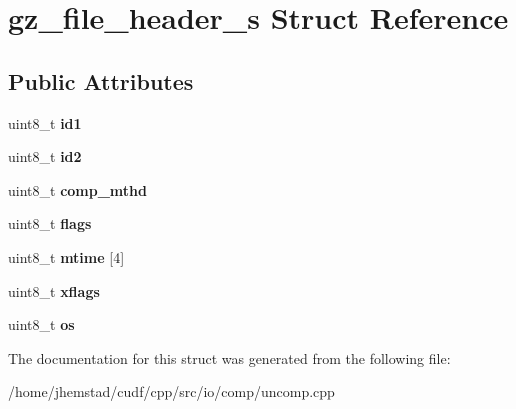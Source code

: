 \hypertarget{structgz__file__header__s}{}\section{gz\+\_\+file\+\_\+header\+\_\+s Struct Reference}
\label{structgz__file__header__s}
\subsection*{Public Attributes}
\begin{DoxyCompactItemize}
\item 
uint8\+\_\+t {\bfseries id1}\hypertarget{structgz__file__header__s_abebc6d25117c54f8409f36bf487ece32}{}\label{structgz__file__header__s_abebc6d25117c54f8409f36bf487ece32}

\item 
uint8\+\_\+t {\bfseries id2}\hypertarget{structgz__file__header__s_acc9fbe962b914c084b169bff7b0e0273}{}\label{structgz__file__header__s_acc9fbe962b914c084b169bff7b0e0273}

\item 
uint8\+\_\+t {\bfseries comp\+\_\+mthd}\hypertarget{structgz__file__header__s_a70b3ece52f22ecba25cc04e128dfa5de}{}\label{structgz__file__header__s_a70b3ece52f22ecba25cc04e128dfa5de}

\item 
uint8\+\_\+t {\bfseries flags}\hypertarget{structgz__file__header__s_a91c3c739560bd3050e74b67ee55cae6b}{}\label{structgz__file__header__s_a91c3c739560bd3050e74b67ee55cae6b}

\item 
uint8\+\_\+t {\bfseries mtime} \mbox{[}4\mbox{]}\hypertarget{structgz__file__header__s_a79d5d37d0108ddd0178c757ac766a0a0}{}\label{structgz__file__header__s_a79d5d37d0108ddd0178c757ac766a0a0}

\item 
uint8\+\_\+t {\bfseries xflags}\hypertarget{structgz__file__header__s_a8e98fd51e492824429023b44e13c8b46}{}\label{structgz__file__header__s_a8e98fd51e492824429023b44e13c8b46}

\item 
uint8\+\_\+t {\bfseries os}\hypertarget{structgz__file__header__s_a10b3be75a54ea90af098223456a2050a}{}\label{structgz__file__header__s_a10b3be75a54ea90af098223456a2050a}

\end{DoxyCompactItemize}


The documentation for this struct was generated from the following file\+:\begin{DoxyCompactItemize}
\item 
/home/jhemstad/cudf/cpp/src/io/comp/uncomp.\+cpp\end{DoxyCompactItemize}
